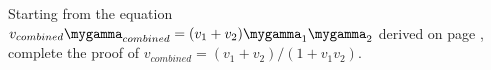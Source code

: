 Starting from the equation $v_{combined}\mygamma_{combined} =
(v_1+v_2)\mygamma_1\mygamma_2$ derived on page \pageref{misc:relativity}, complete the proof of
$v_{combined} = (v_1+v_2)/(1+v_1v_2)$.
